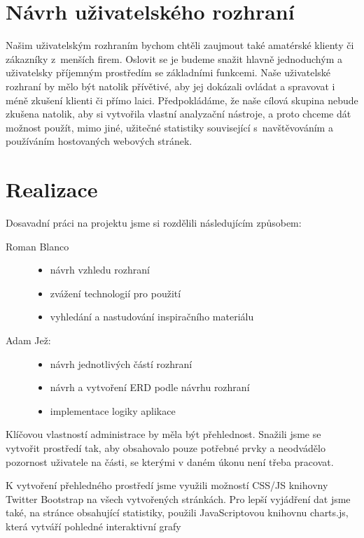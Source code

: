 \documentclass[11pt,a4paper]{article}
\begin{document}
  \section{Návrh uživatelského rozhraní}

    Našim uživatelským rozhraním bychom chtěli zaujmout také amatérské
    klienty či zákazníky z~menších firem. Oslovit se je budeme snažit
    hlavně jednoduchým a uživatelsky příjemným prostředím se základními funkcemi.
    Naše uživatelské rozhraní by mělo být natolik přívětivé, aby
    jej dokázali ovládat a spravovat i méně zkušení klienti či přímo laici.
    Předpokládáme, že naše cílová skupina nebude zkušena natolik, aby si
    vytvořila vlastní analyzační nástroje, a proto chceme dát možnost použít, mimo jiné,
    užitečné statistiky související s~navštěvováním a používáním hostovaných
    webových stránek.

  \section{Realizace}

    Dosavadní práci na projektu jsme si rozdělili následujícím způsobem:
    \begin{description}
      \item[Roman Blanco] \hfill
        \begin{itemize}
          \item návrh vzhledu rozhraní
          \item zvážení technologií pro použití
          \item vyhledání a nastudování inspiračního materiálu
        \end{itemize}
      \item[Adam Jež:] \hfill
        \begin{itemize}
          \item návrh jednotlivých částí rozhraní
          \item návrh a vytvoření ERD podle návrhu rozhraní
          \item implementace logiky aplikace
        \end{itemize}
    \end{description}

    Klíčovou vlastností administrace by měla být přehlednost. Snažili jsme se
    vytvořit prostředí tak, aby obsahovalo pouze potřebné prvky a neodvádělo
    pozornost uživatele na části, se kterými v daném úkonu není třeba pracovat.

    K vytvoření přehledného prostředí jsme využili možností CSS/JS knihovny
    Twitter Bootstrap na všech vytvořených stránkách.
    Pro lepší vyjádření dat jsme také, na stránce obsahující statistiky, použili
    JavaScriptovou knihovnu charts.js, která vytváří pohledné interaktivní grafy
\end{document}

